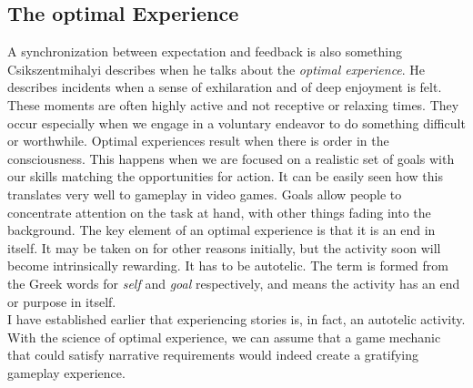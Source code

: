 \subsection{The optimal Experience}
A synchronization between expectation and feedback is also something Csikszentmihalyi describes when he talks about the \textit{optimal experience}. He describes incidents when a sense of exhilaration and of deep enjoyment is felt. These moments are often highly active and not receptive or relaxing times. They occur especially when we engage in a voluntary endeavor to do something difficult or worthwhile. Optimal experiences result when there is order in the consciousness. This happens when we are focused on a realistic set of goals with our skills matching the opportunities for action. It can be easily seen how this translates very well to gameplay in video games. Goals allow people to concentrate attention on the task at hand, with other things fading into the background. The key element of an optimal experience is that it is an end in itself. It may be taken on for other reasons initially, but the activity soon will become intrinsically rewarding. It has to be autotelic. The term is formed from the Greek words for \textit{self} and \textit{goal} respectively, and means the activity has an end or purpose in itself.~\cite{Csikszentmihalyi1990}\\
I have established earlier that experiencing stories is, in fact, an autotelic activity. With the science of optimal experience, we can assume that a game mechanic that could satisfy narrative requirements would indeed create a gratifying gameplay experience.
